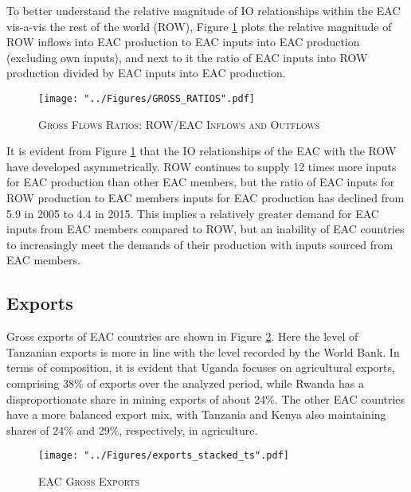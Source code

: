 \documentclass[a4paper]{article}
\begin{document}
To better understand the relative magnitude of IO relationships within the EAC vis-a-vis the rest of the world (ROW), Figure \ref{fig:GR} plots the relative magnitude of ROW inflows into EAC production to EAC inputs into EAC production (excluding own inputs), and next to it the ratio of EAC inputs into ROW production divided by EAC inputs into EAC production. 

\begin{figure}[h!]
\centering
\caption{\label{fig:GR}\textsc{Gross Flows Ratios: ROW/EAC Inflows and Outflows}}
\texttt{[image: "../Figures/GROSS\_RATIOS".pdf]} %
\end{figure}
\FloatBarrier

It is evident from Figure \ref{fig:GR} that the IO relationships of the EAC with the ROW have developed asymmetrically. ROW continues to supply 12 times more inputs for EAC production than other EAC members, but the ratio of EAC inputs for ROW production to EAC members inputs for EAC production has declined from 5.9 in 2005 to 4.4 in 2015. This implies a relatively greater demand for EAC inputs from EAC members compared to ROW, but an inability of EAC countries to increasingly meet the demands of their production with inputs sourced from EAC members. 


\subsection{Exports}

Gross exports of EAC countries are shown in Figure \ref{fig:exp}. Here the level of Tanzanian exports is more in line with the level recorded by the World Bank. In terms of composition, it is evident that Uganda focuses on agricultural exports, comprising 38\% of exports over the analyzed period, while Rwanda has a disproportionate share in mining exports of about 24\%. The other EAC countries have a more balanced export mix, with Tanzania and Kenya also maintaining shares of 24\% and 29\%, respectively, in agriculture. 


\begin{figure}[h!]
\centering
\caption{\label{fig:exp}\textsc{EAC Gross Exports}}
\texttt{[image: "../Figures/exports\_stacked\_ts".pdf]} %
\end{figure}
\FloatBarrier
\end{document}

